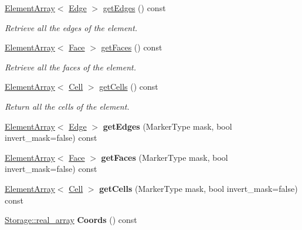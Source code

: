 \begin{DoxyCompactItemize}
\item 
\hyperlink{classINMOST_1_1ElementArray}{Element\-Array}$<$ \hyperlink{classINMOST_1_1Edge}{Edge} $>$ \hyperlink{classINMOST_1_1Node_a43ca7289620b6df3347a1d5622350edb}{get\-Edges} () const 
\begin{DoxyCompactList}\small\item\em Retrieve all the edges of the element. \end{DoxyCompactList}\item 
\hyperlink{classINMOST_1_1ElementArray}{Element\-Array}$<$ \hyperlink{classINMOST_1_1Face}{Face} $>$ \hyperlink{classINMOST_1_1Node_a75d85d68fcd08f7d7f54a14d017bfbe2}{get\-Faces} () const 
\begin{DoxyCompactList}\small\item\em Retrieve all the faces of the element. \end{DoxyCompactList}\item 
\hyperlink{classINMOST_1_1ElementArray}{Element\-Array}$<$ \hyperlink{classINMOST_1_1Cell}{Cell} $>$ \hyperlink{classINMOST_1_1Node_a50abc7d16b296a9f6a2e1211dfb1d35a}{get\-Cells} () const 
\begin{DoxyCompactList}\small\item\em Return all the cells of the element. \end{DoxyCompactList}\item 
\hypertarget{classINMOST_1_1Node_a72e9d75a6afd913bf5f8463eb032948e}{\hyperlink{classINMOST_1_1ElementArray}{Element\-Array}$<$ \hyperlink{classINMOST_1_1Edge}{Edge} $>$ {\bfseries get\-Edges} (Marker\-Type mask, bool invert\-\_\-mask=false) const }\label{classINMOST_1_1Node_a72e9d75a6afd913bf5f8463eb032948e}

\item 
\hypertarget{classINMOST_1_1Node_a0174b70bae7e1959f18ff510fb736b89}{\hyperlink{classINMOST_1_1ElementArray}{Element\-Array}$<$ \hyperlink{classINMOST_1_1Face}{Face} $>$ {\bfseries get\-Faces} (Marker\-Type mask, bool invert\-\_\-mask=false) const }\label{classINMOST_1_1Node_a0174b70bae7e1959f18ff510fb736b89}

\item 
\hypertarget{classINMOST_1_1Node_ab2356978740c0fb34ad3e28b0a3251c2}{\hyperlink{classINMOST_1_1ElementArray}{Element\-Array}$<$ \hyperlink{classINMOST_1_1Cell}{Cell} $>$ {\bfseries get\-Cells} (Marker\-Type mask, bool invert\-\_\-mask=false) const }\label{classINMOST_1_1Node_ab2356978740c0fb34ad3e28b0a3251c2}

\item 
\hypertarget{classINMOST_1_1Node_aa309c3659f9c5c726ac2bf552a3f1963}{\hyperlink{classINMOST_1_1Storage_a430e5358d435befb38169beef593527e}{Storage\-::real\-\_\-array} {\bfseries Coords} () const }\label{classINMOST_1_1Node_aa309c3659f9c5c726ac2bf552a3f1963}

\end{DoxyCompactItemize}
